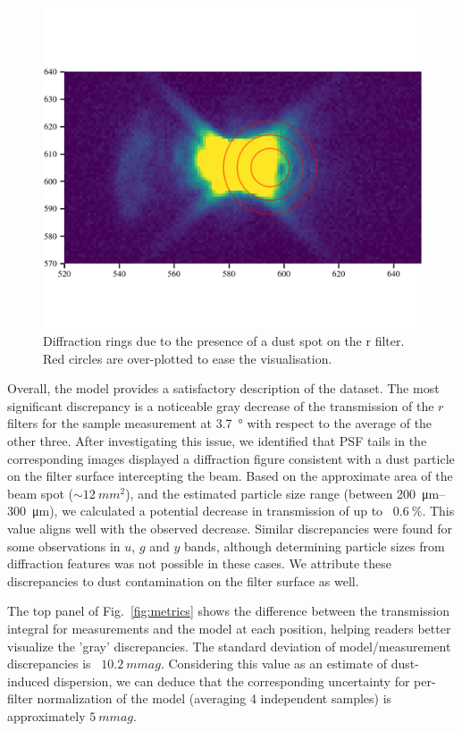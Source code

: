 \begin{figure}
  \centering
  \includegraphics[width=1\linewidth]{fig/diffraction_dust.png}
  \caption{Diffraction rings due to the presence of a dust spot on the r filter. Red circles are over-plotted to ease the visualisation.}
  \label{fig:dust}
\end{figure}


Overall, the model provides a satisfactory description of the
dataset. The most significant discrepancy is a noticeable gray
decrease of the transmission of the $r$ filters for the sample
measurement at \SI{3.7}{\degree} with respect to the average of the
other three.  After investigating this issue, we identified that PSF
tails in the corresponding images displayed a diffraction figure
consistent with a dust particle on the filter surface intercepting the
beam. Based on the approximate area of the beam spot
($\sim\SI{12}{mm^2}$), and the estimated particle size range (between
\SIrange{200}{300}{\micro\metre}), we calculated a potential decrease
in transmission of up to ~$\SI{0.6}{\percent}$. This value aligns well
with the observed decrease. Similar discrepancies were found for some
observations in $u$, $g$ and $y$ bands, although determining particle
sizes from diffraction features was not possible in these cases. We
attribute these discrepancies to dust contamination on the filter
surface as well.

The top panel of Fig.~\ref{fig:metrics} shows the difference between
the transmission integral for measurements and the model at each
position, helping readers better visualize the 'gray'
discrepancies. The standard deviation of model/measurement
discrepancies is ~$\SI{10.2}{mmag}$. Considering this value as an
estimate of dust-induced dispersion, we can deduce that the
corresponding uncertainty for per-filter normalization of the model
(averaging 4 independent samples) is approximately $\SI{5}{mmag}$.

